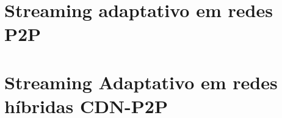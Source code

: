 \documentclass[
	12pt,				%
	oneside,			%
	a4paper,			%
	english,			%
	brazil				%
	]{abntex2ppgsi}
\begin{document}
\section{Streaming adaptativo em redes P2P}




\section{Streaming Adaptativo em redes híbridas CDN-P2P}


\end{document}
